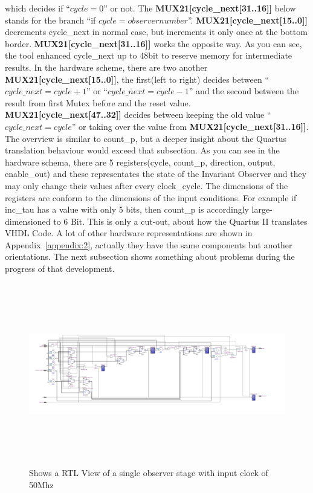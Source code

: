 which decides if ``$cycle=0$'' or not. \newline
The \textbf{MUX21[cycle\_next[31..16]]} below stands for the branch ``if $cycle=observernumber$''. 
\textbf{MUX21[cycle\_next[15..0]]} decrements cycle\_next in normal case, but increments it only once at the bottom border. 
\textbf{MUX21[cycle\_next[31..16]]} works the opposite way. 
As you can see, the tool enhanced cycle\_next up to 48bit to reserve memory for intermediate results. \newline
In the hardware scheme, there are two another \textbf{MUX21[cycle\_next[15..0]]}, the first(left to right) decides between  ``$cycle\_next=cycle+1$'' or ``$cycle\_next=cycle-1$'' and the second 
between the result from first Mutex before and the reset value. \textbf{MUX21[cycle\_next[47..32]]} decides between keeping the old value ``$cycle\_next=cycle$'' or 
taking over the value from \textbf{MUX21[cycle\_next[31..16]]}. The overview is similar to count\_p, but a deeper insight about the Quartus translation behaviour would exceed that subsection. 
As you can see in the hardware schema, there are 5 registers(cycle, count\_p, direction, output, enable\_out) 
and these representates the state of the Invariant Observer and they may only change their values after every clock\_cycle. 
The dimensions of the registers are conform to the dimensions of the input conditions. 
For example if inc\_tau has a value with only 5 bits, then count\_p is accordingly large-dimensioned to 6 Bit. 
This is only a cut-out, about how the Quartus II translates VHDL Code. 
A lot of other hardware representations are shown in Appendix~\ref{appendix:2}, actually they have the same components but another orientations. 
The next subsection shows something about problems during the progress of that development. 

\begin{figure}[]
\centering
\includegraphics[width=650px,height=300px,angle=-90]{../../pictures/22.02.2014/onlyObserver/OBS_50M.jpg}
\caption[RTL View of Observer 0 with clock 50Mhz]{Shows a RTL View of a single observer stage with input clock of 50Mhz}
\label{fig:test:only:50:obs0}
\end{figure}

